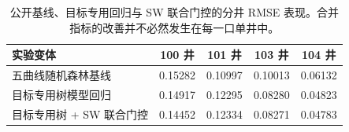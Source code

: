 \begin{table}[t]
\centering
\caption{公开 Volve 基准复现检验。RMSE 为 VSH、PHIF 和 SW 三目标的合并误差。辅助容差指标计算公式为 $\max(0,1-|a-y|/[c(|y|+10^{-7})])$，其中 PHIF 取 $c=0.08$，SW 取 $c=0.05$；该指标仅作为诊断参考，非竞赛主客观 RMSE 指标。容差动作在各目标分箱代表值之间使用 600 个网格点进行离散解码。}
\label{tab:public-metrics}
\small
{}
\end{table}

\begin{table}[t]
\centering
\caption{公开基线、目标专用回归与 SW 联合门控的分井 RMSE 表现。合并指标的改善并不必然发生在每一口单井中。}
\label{tab:public-wells}
\small
\setlength{\tabcolsep}{12pt}
\begin{tabular}{l cccc}
\toprule
实验变体 & 100 井 & 101 井 & 103 井 & 104 井 \\
\midrule
五曲线随机森林基线 & 0.15282 & 0.10997 & 0.10013 & 0.06132 \\
目标专用树模型回归 & 0.14917 & 0.12295 & 0.08280 & 0.04823 \\
目标专用树 + SW 联合门控 & 0.14452 & 0.12334 & 0.08271 & 0.04783 \\
\bottomrule
\end{tabular}
\end{table}
